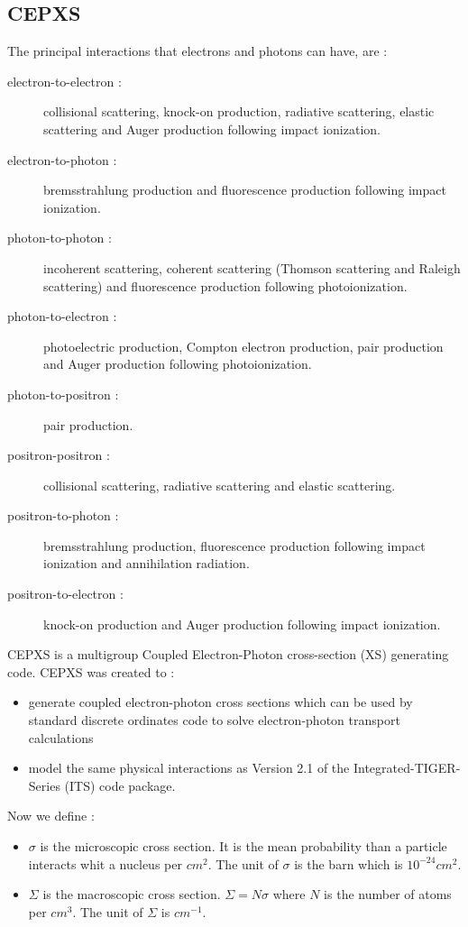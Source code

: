 \subsection{CEPXS}
The principal interactions that electrons and photons can have, are
\cite{cepxs} :
\begin{description}
\item [electron-to-electron :] collisional scattering, knock-on production,
radiative scattering, elastic scattering and Auger production following impact
ionization.
\item [electron-to-photon :] bremsstrahlung production and fluorescence
production following impact ionization.
\item [photon-to-photon :] incoherent scattering, coherent scattering (Thomson 
scattering and Raleigh scattering) and fluorescence production following
photoionization.
\item [photon-to-electron :] photoelectric production, Compton electron
production, pair production and Auger production following photoionization.
\item [photon-to-positron :] pair production.
\item [positron-positron :] collisional scattering, radiative scattering and
elastic scattering.
\item [positron-to-photon :] bremsstrahlung production, fluorescence
production following impact ionization and annihilation radiation.
\item [positron-to-electron :] knock-on production and Auger production
following impact ionization.
\end{description}
CEPXS is a multigroup Coupled Electron-Photon cross-section (XS) generating
code. CEPXS was created to \cite{cepxs} :
\begin{itemize}
\item generate coupled electron-photon cross sections which can be used by
standard discrete ordinates code to solve electron-photon transport
calculations
\item model the same physical interactions as Version 2.1 of the
Integrated-TIGER-Series (ITS) code package.
\end{itemize}
Now we define \cite{barjon} :
\begin{itemize}
\item $\sigma$ is the microscopic cross section. It is the mean probability than a
particle interacts whit a nucleus per $cm^2$. The unit of $\sigma$ is the barn
which is $10^{-24}cm^2$.
\item $\Sigma$ is the macroscopic cross section. $\Sigma = N \sigma$ where $N$
is the number of atoms per $cm^3$. The unit of $\Sigma$ is $cm^{-1}$.
\end{itemize}
